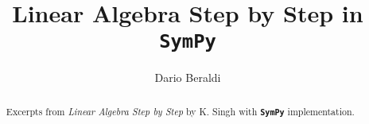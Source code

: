 \documentclass[a4paper]{article}
\newcommand{\sympy}{\textbf{\texttt{\textcolor{OliveGreen}{SymPy}} }}
\begin{document}
\title{Linear Algebra Step by Step in \sympy}

\author{Dario Beraldi}
\maketitle
\tableofcontents

\begin{abstract}
Excerpts from \textit{Linear Algebra Step by Step} by K. Singh 
with \sympy implementation.
\end{abstract}



\end{document}
